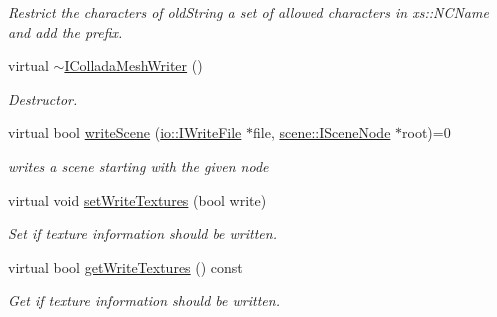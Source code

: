 \begin{DoxyCompactItemize}
\begin{DoxyCompactList}\small\item\em Restrict the characters of old\+String a set of allowed characters in xs\+::\+N\+C\+Name and add the prefix. \end{DoxyCompactList}\item 
\mbox{\label{classirr_1_1scene_1_1IColladaMeshWriter_a85ed9eb856663c6698e1f7c4535b9057}} 
virtual \hyperlink{classirr_1_1scene_1_1IColladaMeshWriter_a85ed9eb856663c6698e1f7c4535b9057}{$\sim$\+I\+Collada\+Mesh\+Writer} ()
\begin{DoxyCompactList}\small\item\em Destructor. \end{DoxyCompactList}\item 
\mbox{\label{classirr_1_1scene_1_1IColladaMeshWriter_ad2e6e7617052c83d5f19d7811e0d5fd7}} 
virtual bool \hyperlink{classirr_1_1scene_1_1IColladaMeshWriter_ad2e6e7617052c83d5f19d7811e0d5fd7}{write\+Scene} (\hyperlink{classirr_1_1io_1_1IWriteFile}{io\+::\+I\+Write\+File} $\ast$file, \hyperlink{classirr_1_1scene_1_1ISceneNode}{scene\+::\+I\+Scene\+Node} $\ast$root)=0
\begin{DoxyCompactList}\small\item\em writes a scene starting with the given node \end{DoxyCompactList}\item 
\mbox{\label{classirr_1_1scene_1_1IColladaMeshWriter_a2fa67e9fcfefdc6cf71d682e9891d15e}} 
virtual void \hyperlink{classirr_1_1scene_1_1IColladaMeshWriter_a2fa67e9fcfefdc6cf71d682e9891d15e}{set\+Write\+Textures} (bool write)
\begin{DoxyCompactList}\small\item\em Set if texture information should be written. \end{DoxyCompactList}\item 
\mbox{\label{classirr_1_1scene_1_1IColladaMeshWriter_a55088db1ff55ebb1a657fac22f52386b}} 
virtual bool \hyperlink{classirr_1_1scene_1_1IColladaMeshWriter_a55088db1ff55ebb1a657fac22f52386b}{get\+Write\+Textures} () const
\begin{DoxyCompactList}\small\item\em Get if texture information should be written. \end{DoxyCompactList}\item 

\end{DoxyCompactItemize}
